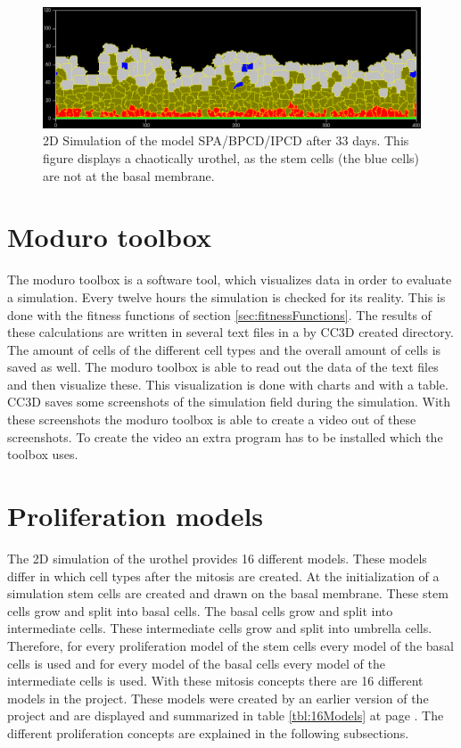 \begin{figure}[ht]
	\center
	\includegraphics[scale=0.35]{figures/2DSimulation-33Days.png}
	\caption[2D Simulation of the model SPA/BPCD/IPCD after 33 days]{2D Simulation of the model SPA/BPCD/IPCD after 33 days. This figure displays a chaotically urothel, as the stem cells (the blue cells) are not at the basal membrane.}
	\label{img:2DSimulation33Days}
\end{figure}

\section{Moduro toolbox}
The moduro toolbox is a software tool, which visualizes data in order to evaluate a simulation. \newline
Every twelve hours the simulation is checked for its reality. This is done with the fitness functions of section \ref{sec:fitnessFunctions}. The results of these calculations are written in several text files in a by \ac{CC3D} created directory. The amount of cells of the different cell types and the overall amount of cells is saved as well. The moduro toolbox is able to read out the data of the text files and then visualize these. This visualization is done with charts and with a table. \newline
\ac{CC3D} saves some screenshots of the simulation field during the simulation. With these screenshots the moduro toolbox is able to create a video out of these screenshots. To create the video an extra program has to be installed which the toolbox  uses.

\section{Proliferation models}\label{sec:Models}
The 2D simulation of the urothel provides 16 different models. These models differ in which cell types after the mitosis are created. \newline 
At the initialization of a simulation stem cells are created and drawn on the basal membrane. These stem cells grow and split into basal cells. The basal cells grow and split into intermediate cells. These intermediate cells grow and split into umbrella cells. Therefore, for every proliferation model of the stem cells every model of the basal cells is used and for every model of the basal cells every model of the intermediate cells is used. \newline
With these mitosis concepts there are 16 different models in the project. These models were created by an earlier version of the project \cite{Torelli2017} and are displayed and summarized in table \ref{tbl:16Models} at page \pageref{tbl:16Models}. The different proliferation concepts are explained in the following subsections.

